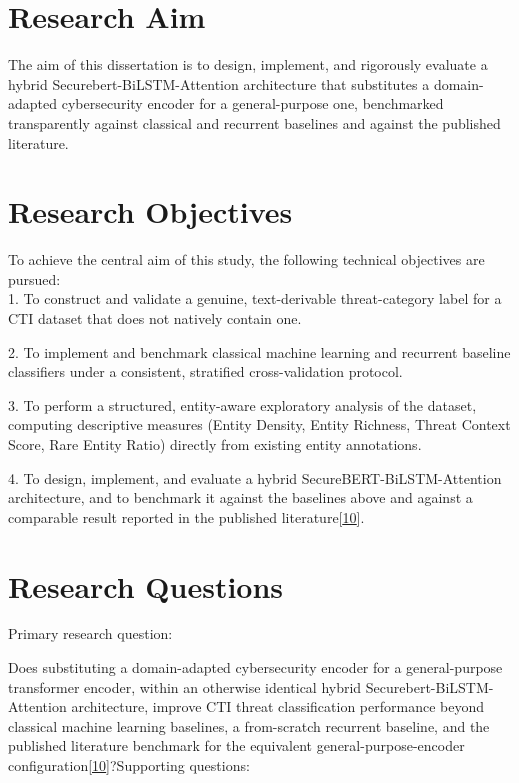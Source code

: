 \documentclass[12pt,a4paper]{report}
\begin{document}
\protect{}\label{_Toc239502926}{}\section{Research Aim}

The aim of this dissertation is to design, implement, and rigorously
evaluate a hybrid Securebert-BiLSTM-Attention architecture that
substitutes a domain-adapted cybersecurity encoder for a general-purpose
one, benchmarked transparently against classical and recurrent baselines
and against the published literature.

\protect{}\label{_Toc239502927}{}\section{Research
Objectives}

To achieve the central aim of this study, the following technical
objectives are pursued:\\
1. To construct and validate a genuine, text-derivable threat-category
label for a CTI dataset that does not natively contain one.

2. To implement and benchmark classical machine learning and recurrent
baseline classifiers under a consistent, stratified cross-validation
protocol.

3. To perform a structured, entity-aware exploratory analysis of the
dataset, computing descriptive measures (Entity Density, Entity
Richness, Threat Context Score, Rare Entity Ratio) directly from
existing entity annotations.

4. To design, implement, and evaluate a hybrid
SecureBERT-BiLSTM-Attention architecture, and to benchmark it against
the baselines above and against a comparable result reported in the
published
literature{[}\href{file:///D:/Downloads/final-report-formatted-v4(1).docx\#ref_10}{\ul{10}}{]}.

\protect{}\label{_Toc239502928}{}\section{Research
Questions}

Primary research question:

Does substituting a domain-adapted cybersecurity encoder for a
general-purpose transformer encoder, within an otherwise identical
hybrid Securebert-BiLSTM-Attention architecture, improve CTI threat
classification performance beyond classical machine learning baselines,
a from-scratch recurrent baseline, and the published literature
benchmark for the equivalent general-purpose-encoder
configuration{[}\href{file:///D:/Downloads/final-report-formatted-v4(1).docx\#ref_10}{\ul{10}}{]}?Supporting
questions:
\end{document}
